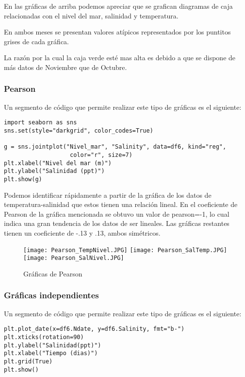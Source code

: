 \documentclass[a4paper]{article}
\begin{document}
En las gráficas de arriba podemos apreciar que se grafican diagramas de caja relacionadas con el nivel del mar, salinidad y temperatura. 

En ambos meses se presentan valores atípicos representados por los puntitos grises de cada gráfica.

La razón por la cual la caja verde esté mas alta es debido a que se dispone de más datos de Noviembre que de Octubre.







\subsubsection{Pearson}

Un segmento de código que permite realizar este tipo de gráficas es el siguiente:

\begin{verbatim}
import seaborn as sns
sns.set(style="darkgrid", color_codes=True)

g = sns.jointplot("Nivel_mar", "Salinity", data=df6, kind="reg",
                   color="r", size=7)
plt.xlabel("Nivel del mar (m)")
plt.ylabel("Salinidad (ppt)")
plt.show(g)
\end{verbatim}

Podemos identificar rápidamente a partir de la gráfica de los datos de temperatura-salinidad que estos tienen una relación lineal. En el coeficiente de Pearson de la gráfica mencionada se obtuvo un valor de pearson=-1, lo cual indica una gran tendencia de los datos de ser lineales. Las gráficas restantes tienen un coeficiente de -.13 y .13, ambos simétricos.

\begin{figure}[h!]
\centering 
\texttt{[image: Pearson\_TempNivel.JPG]}
\label{fig:00Z}
\texttt{[image: Pearson\_SalTemp.JPG]}
\label{fig:12Z}  
\texttt{[image: Pearson\_SalNivel.JPG]}
\caption{Gráficas de Pearson}
\end{figure}



\subsubsection{Gráficas independientes}

Un segmento de código que permite realizar este tipo de gráficas es el siguiente:

\begin{verbatim}
plt.plot_date(x=df6.Ndate, y=df6.Salinity, fmt="b-")
plt.xticks(rotation=90)
plt.ylabel("Salinidad(ppt)")
plt.xlabel("Tiempo (dias)")
plt.grid(True)
plt.show()
\end{verbatim}
\end{document}
